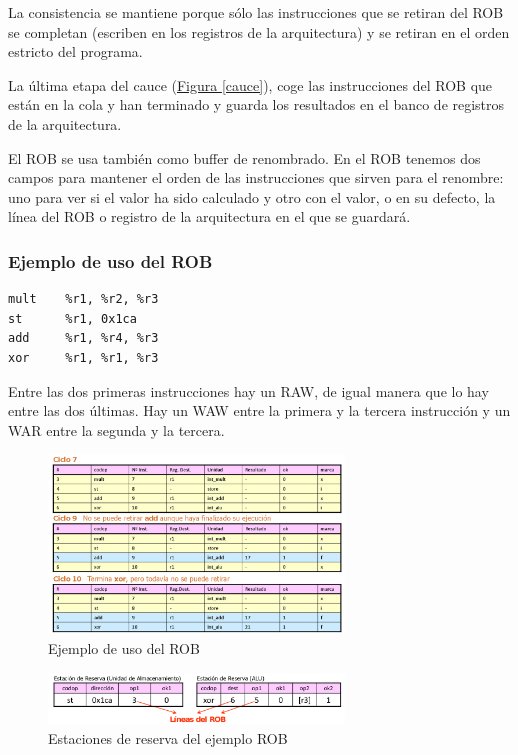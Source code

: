 \documentclass[10pt,a4paper,spanish]{report}
\begin{document}
La consistencia se mantiene porque sólo las instrucciones que se retiran del ROB se completan (escriben en los registros de la arquitectura) y se retiran en el orden estricto del programa.

La última etapa del cauce (\hyperref[cauce]{Figura \ref*{cauce}}), coge las instrucciones del ROB que están en la cola y han terminado y guarda los resultados en el banco de registros de la arquitectura. 

El ROB se usa también como buffer de renombrado. En el ROB tenemos dos campos para mantener el orden de las instrucciones que sirven para el renombre: uno para ver si el valor ha sido calculado y otro con el valor, o en su defecto, la línea del ROB o registro de la arquitectura en el que se guardará. 

\textcolor{azul}{\subsubsection{Ejemplo de uso del ROB}}
\begin{verbatim}
mult    %r1, %r2, %r3
st      %r1, 0x1ca
add     %r1, %r4, %r3
xor     %r1, %r1, %r3
\end{verbatim}

Entre las dos primeras instrucciones hay un RAW, de igual manera que lo hay entre las dos últimas. Hay un WAW entre la primera y la tercera instrucción y un WAR entre la segunda y la tercera.

\begin{figure}[!h]
\centering
\includegraphics[width=0.7\textwidth]{101}
\caption{Ejemplo de uso del ROB}
\label{ejemplo_rob}
\end{figure}

\begin{figure}[!h]
\centering
\includegraphics[width=0.7\textwidth]{102}
\caption{Estaciones de reserva del ejemplo ROB}
\label{ejemplo_rob1}
\end{figure}
\end{document}
